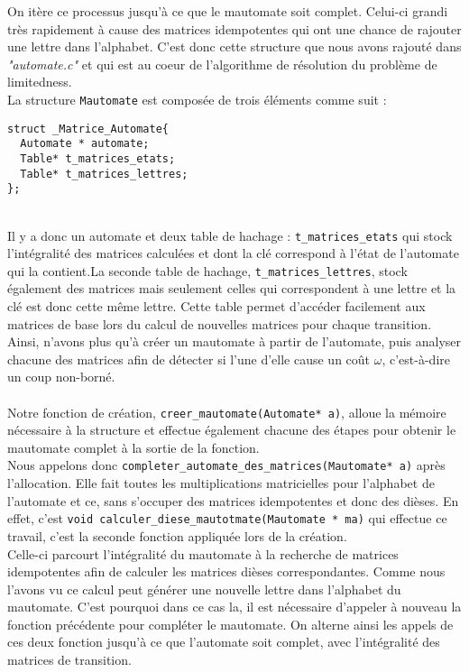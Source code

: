 \documentclass{report}
\begin{document}
On itère ce processus jusqu'à ce que le mautomate soit complet. Celui-ci grandi très rapidement à cause des matrices idempotentes qui ont une chance de rajouter une lettre dans l'alphabet. C'est donc cette structure que nous avons rajouté dans \textit{"automate.c"} et qui est au coeur de l'algorithme de résolution du problème de limitedness.\\

La structure \verb?Mautomate? est composée de trois éléments comme suit :

\begin{lstlisting}[frame=single]
struct _Matrice_Automate{
  Automate * automate;
  Table* t_matrices_etats;
  Table* t_matrices_lettres;
};
\end{lstlisting}
$ $\\\\

Il y a donc un automate et deux table de hachage : \verb?t_matrices_etats? qui stock l'intégralité des matrices calculées et dont la clé correspond à l'état de l'automate qui la contient.La seconde table de hachage, \verb?t_matrices_lettres?, stock également des matrices mais seulement celles qui correspondent à une lettre et la clé est donc cette même lettre. Cette table permet d’accéder facilement aux matrices de base lors du calcul de nouvelles matrices pour chaque transition.\\

Ainsi, n'avons plus qu'à créer un mautomate à partir de l'automate, puis analyser chacune des matrices afin de détecter si l'une d'elle cause un coût $\omega$, c'est-à-dire un coup non-borné.
\\\\
Notre fonction de création, \verb?creer_mautomate(Automate* a)?, alloue la mémoire nécessaire à la structure et effectue également chacune des étapes pour obtenir le mautomate complet à la sortie de la fonction.\\
Nous appelons donc \verb?completer_automate_des_matrices(Mautomate* a)? après l'allocation. Elle fait toutes les multiplications matricielles pour l'alphabet de l'automate et ce, sans s'occuper des matrices idempotentes et donc des dièses. En effet, c'est \verb?void calculer_diese_mautotmate(Mautomate * ma)? qui effectue ce travail, c'est la seconde fonction appliquée lors de la création. \\
Celle-ci parcourt l'intégralité du mautomate à la recherche de matrices idempotentes afin de calculer les matrices dièses correspondantes. Comme nous l'avons vu ce calcul peut générer une nouvelle lettre dans l'alphabet du mautomate. C'est pourquoi dans ce cas la, il est nécessaire d'appeler à nouveau la fonction précédente pour compléter le mautomate. On alterne ainsi les appels de ces deux fonction jusqu'à ce que l'automate soit complet, avec l'intégralité des matrices de transition.\\
\end{document}
